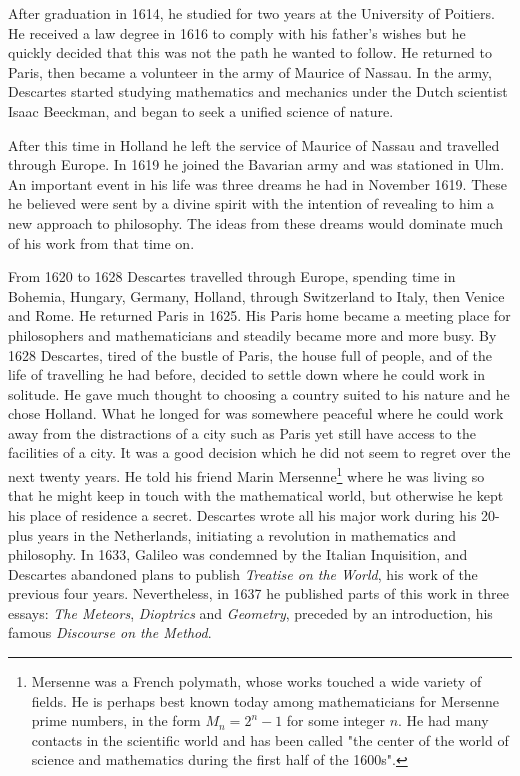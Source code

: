 \documentclass{article}
\begin{document}
After graduation in 1614, he studied for two years at the University of Poitiers. He received a law degree in 1616 to comply with his father's wishes but he quickly decided that this was not the path he wanted to follow. He returned to Paris, then became a volunteer in the army of Maurice of Nassau. In the army, Descartes started studying mathematics and mechanics under the Dutch scientist Isaac Beeckman, and began to seek a unified science of nature.

After this time in Holland he left the service of Maurice of Nassau and travelled through Europe. In 1619 he joined the Bavarian army and was stationed in Ulm. An important event in his life was three dreams he had in November 1619. These he believed were sent by a divine spirit with the intention of revealing to him a new approach to philosophy. The ideas from these dreams would dominate much of his work from that time on.

From 1620 to 1628 Descartes travelled through Europe, spending time in Bohemia, Hungary, Germany, Holland, through Switzerland to Italy, then Venice and Rome. He returned Paris in 1625. His Paris home became a meeting place for philosophers and mathematicians and steadily became more and more busy. By 1628 Descartes, tired of the bustle of Paris, the house full of people, and of the life of travelling he had before, decided to settle down where he could work in solitude. He gave much thought to choosing a country suited to his nature and he chose Holland. What he longed for was somewhere peaceful where he could work away from the distractions of a city such as Paris yet still have access to the facilities of a city. It was a good decision which he did not seem to regret over the next twenty years. He told his friend Marin Mersenne\footnote{Mersenne was a French polymath, whose works touched a wide variety of fields. He is perhaps best known today among mathematicians for Mersenne prime numbers, in the form $M_n = 2^n − 1$ for some integer $n$. He had many contacts in the scientific world and has been called "the center of the world of science and mathematics during the first half of the 1600s".} where he was living so that he might keep in touch with the mathematical world, but otherwise he kept his place of residence a secret. Descartes wrote all his major work during his 20-plus years in the Netherlands, initiating a revolution in mathematics and philosophy. In 1633, Galileo was condemned by the Italian Inquisition, and Descartes abandoned plans to publish {\em Treatise on the World}, his work of the previous four years. Nevertheless, in 1637 he published parts of this work in three essays: {\em The Meteors}, {\em Dioptrics} and {\em Geometry}, preceded by an introduction, his famous {\em Discourse on the Method}.
\end{document}
